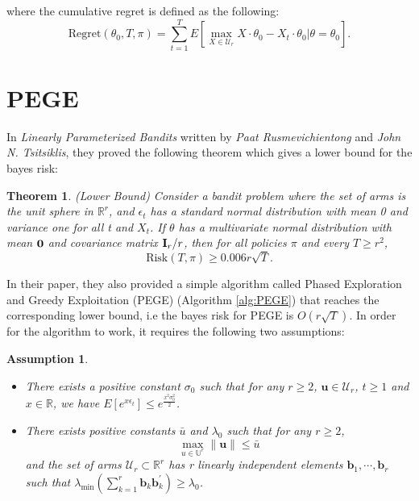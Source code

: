 \documentclass{article}
\newtheorem{theorem}{Theorem}
\theoremstyle{plain}
\newtheorem{assumption}{Assumption}
\theoremstyle{definition}
\begin{document}
where the cumulative regret is defined as the following:
\begin{equation}
\text{Regret}(\theta_{0},T,\pi)=\sum_{t=1}^{T}E\left[\max_{X\in \mathcal{U}_{r}}X\cdot\theta_{0}-X_{t}\cdot \theta_{0}|\theta=\theta_{0}\right].
\end{equation}





\section{PEGE}

In \textit{Linearly Parameterized Bandits} written by \textit{Paat Rusmevichientong} and \textit{John N. Tsitsiklis}, they proved the following theorem which gives a lower bound for the bayes risk:

\begin{theorem}(Lower Bound)
Consider a bandit problem where the set of arms is the unit sphere in $\mathbb{R}^{r}$, and $\epsilon_{t}$ has a standard normal distribution with mean 0 and variance one for all t and $X_{t}$. If $\theta$ has a multivariate normal distribution with mean $\bold{0}$ and covariance matrix $\bold{I}_{r}/r$, then for all policies $\pi$ and every $T\geq r^{2}$,
\begin{equation}
\text{Risk}(T,\pi)\geq 0.006r\sqrt{T}. \nonumber 
\end{equation}
\end{theorem}

In their paper, they also provided a simple algorithm called Phased Exploration and Greedy Exploitation (PEGE) (Algorithm \ref{alg:PEGE}) that reaches the corresponding lower bound, i.e the bayes risk for PEGE is $O(r\sqrt{T})$. In order for the algorithm to work, it requires the following two assumptions:

\begin{assumption}
\begin{itemize}
\item There exists a positive constant $\sigma_{0}$ such that for any $r\geq 2$, $\textbf{u}\in \mathcal{U}_{r}$, $t\geq 1$ and $x\in \mathbb{R}$, we have $E[e^{x \epsilon_{t}}]\leq e^{\frac{x^{2}\sigma_{0}^{2}}{2}}$.
\item There exists positive constants $\bar{u}$ and $\lambda_{0}$ such that for any $r\geq 2$,
\begin{equation}
\max_{u\in \mathbb{U}^{r}}\|\textbf{u}\|\leq \bar{u} \nonumber
\end{equation}
and the set of arms $\mathcal{U}_{r}\subset 
\mathbb{R}^{r}$ has r linearly independent elements $\textbf{b}_{1},\cdots,\textbf{b}_{r}$ such that $\lambda_{\min}(\sum_{k=1}^{r}\textbf{b}_{k}\textbf{b}_{k}^{'})\geq \lambda_{0}$.
\end{itemize}
\end{assumption}
\end{document}
